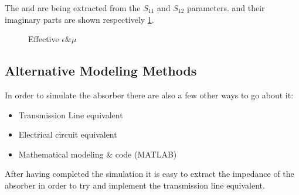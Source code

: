         The \epsilon and \mu are being extracted from the $S_{11}$ and $S_{12}$ parameters.
        and their imaginary parts are shown respectively \ref{plt:EpsilonMu}.
        \begin{figure}[h]
            \centering
            \caption{\textsf{Effective $\epsilon \& \mu$}}
            \label{plt:EpsilonMu}
        \end{figure}
        

    \subsection{\textsf{Alternative Modeling Methods}}
        In order to simulate the absorber there are also a few other ways to go about it:
        \begin{itemize}
            \item Transmission Line equivalent
            \item Electrical circuit equivalent
            \item Mathematical modeling \& code (MATLAB)
        \end{itemize}
        
        After having completed the simulation it is easy to extract the impedance of the
        absorber in order to try and implement the transmission line equivalent.
        
